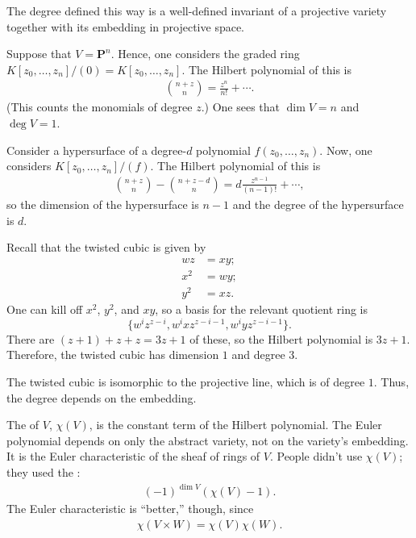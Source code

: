 \documentclass [11 pt, oneside] {article}
\begin{document}
\begin{remark}
	The degree defined this way is a well-defined invariant of a projective variety together with its embedding in projective space.
\end{remark}

\begin{example}[ ]\label{}\text{}
Suppose that $V=\mathbf{P}^n$. Hence, one considers the graded ring $K[z_0,\hdots,z_n]/(0)=K[z_0,\hdots,z_n]$. The Hilbert polynomial of this is
\begin{align*}
	\binom{n+z}{n} = \frac{z^n}{n!} + \cdots.
\end{align*}
(This counts the monomials of degree $z$.) One sees that $\dim V = n$ and $\deg V = 1$. 
\end{example}

\begin{example}[ ]\label{}\text{}
Consider a hypersurface of a degree-$d$ polynomial $f(z_0,\hdots, z_n)$. Now, one considers $K[z_0,\hdots, z_n]/(f)$. The Hilbert polynomial of this is
\begin{align*}
	\binom{n+z}{n} - \binom{n+z-d}{n}  = d \frac{z^{n-1}}{(n-1)!} + \cdots,
\end{align*}
so the dimension of the hypersurface is $n-1$ and the degree of the hypersurface is $d$.
\end{example}

\begin{example}\label{}\text{}
 Recall that the twisted cubic is given by
\begin{align*}
	wz &= xy;\\
	x^2 &= wy;\\
	y^2 &= xz.
\end{align*}
One can kill off $x^2$, $y^2$, and $xy$, so a basis for the relevant quotient ring is 
\[
	\{w^iz^{z- i}, w^ixz^{z- i -1}, w^iyz^{z-i-1}\}. %
\] 
There are $( z+ 1)+z +  z = 3z + 1$ of these, so the Hilbert polynomial is $3z+1$. Therefore, the twisted cubic has dimension $1$ and degree $3$.
\end{example}

\begin{remark}
	The twisted cubic is isomorphic to the projective line, which is of degree $1$. Thus, the degree depends on the embedding.
\end{remark}

The  of $V$, $\chi(V)$, is the constant term of the Hilbert polynomial. The Euler polynomial depends on only the abstract variety, not on the variety's embedding. It is the Euler characteristic of the sheaf of rings of $V$. People didn't use $\chi(V)$; they used the :
\begin{align*}
	(-1)^{\dim V}  (\chi(V)-1).
\end{align*}
The Euler characteristic is ``better,'' though, since
\begin{align*}
	\chi(V\times W) = \chi (V)\chi (W).
\end{align*}
\end{document}
